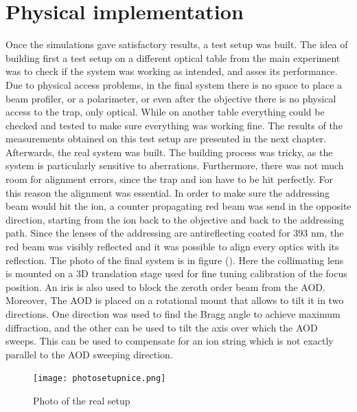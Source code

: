 \section{Physical implementation}
Once the simulations gave satisfactory results, a test setup was built. The idea of building first a test setup on a different optical table from the main experiment was to check if the system was working as intended, and asses its performance. Due to physical access problems, in the final system there is no space to place a beam profiler, or a polarimeter, or even after the objective there is no physical access to the trap, only optical. While on another table everything could be checked and tested to make sure everything was working fine. The results of the measurements obtained on this test setup are presented in the next chapter.\\
Afterwards, the real system was built. The building process was tricky, as the system is particularly sensitive to aberrations. Furthermore, there was not much room for alignment errors, since the trap and ion have to be hit perfectly. For this reason the alignment was essential. In order to make sure the addressing beam would hit the ion, a counter propagating red beam was send in the opposite direction, starting from the ion back to the objective and back to the addressing path. Since the lenses of the addressing are antireflecting coated for 393 nm, the red beam was visibly reflected and it was possible to align every optics with its reflection. The photo of the final system is in figure (). Here the collimating lens is mounted on a 3D translation stage used for fine tuning calibration of the focus position. An iris is also used to block the zeroth order beam from the AOD. Moreover, The AOD is placed on a rotational mount that allows to tilt it in two directions. One direction was used to find the Bragg angle to achieve maximum diffraction, and the other can be used to tilt the axis over which the AOD sweeps. This can be used to compensate for an ion string which is not exactly parallel to the AOD sweeping direction.

\begin{figure}[H]
\centering
\texttt{[image: photosetupnice.png]}
\caption{Photo of the real setup}
\end{figure}
